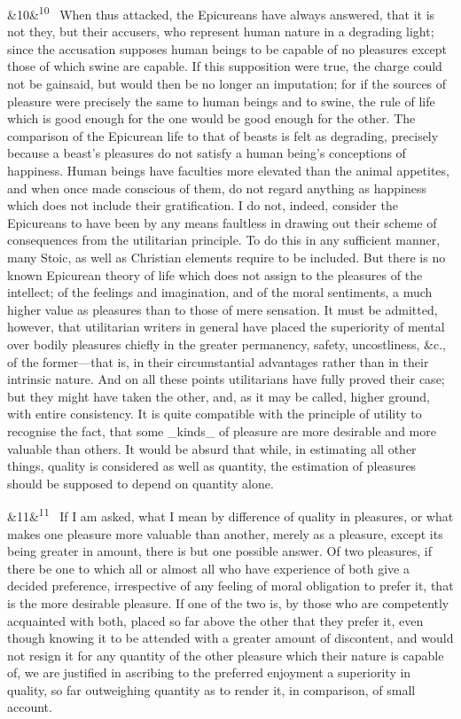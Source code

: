 \documentclass[12pt]{article}
\newcommand{\para}[1][]{\par\noindent\ifx&#1&\else\textsuperscript{\footnotesize #1}~\fi}
\begin{document}
\para[10] When thus attacked, the Epicureans have always answered, that it is not they, but their accusers, who represent human nature in a degrading light; since the accusation supposes human beings to be capable of no pleasures except those of which swine are capable. If this supposition were true, the charge could not be gainsaid, but would then be no longer an imputation; for if the sources of pleasure were precisely the same to human beings and to swine, the rule of life which is good enough for the one would be good enough for the other. The comparison of the Epicurean life to that of beasts is felt as degrading, precisely because a beast's pleasures do not satisfy a human being's conceptions of happiness. Human beings have faculties more elevated than the animal appetites, and when once made conscious of them, do not regard anything as happiness which does not include their gratification. I do not, indeed, consider the Epicureans to have been by any means faultless in drawing out their scheme of consequences from the utilitarian principle. To do this in any sufficient manner, many Stoic, as well as Christian elements require to be included. But there is no known Epicurean theory of life which does not assign to the pleasures of the intellect; of the feelings and imagination, and of the moral sentiments, a much higher value as pleasures than to those of mere sensation. It must be admitted, however, that utilitarian writers in general have placed the superiority of mental over bodily pleasures chiefly in the greater permanency, safety, uncostliness, \&c., of the former---that is, in their circumstantial advantages rather than in their intrinsic nature. And on all these points utilitarians have fully proved their case; but they might have taken the other, and, as it may be called, higher ground, with entire consistency. It is quite compatible with the principle of utility to recognise the fact, that some \_kinds\_ of pleasure are more desirable and more valuable than others. It would be absurd that while, in estimating all other things, quality is considered as well as quantity, the estimation of pleasures should be supposed to depend on quantity alone.

\para[11] If I am asked, what I mean by difference of quality in pleasures, or what makes one pleasure more valuable than another, merely as a pleasure, except its being greater in amount, there is but one possible answer. Of two pleasures, if there be one to which all or almost all who have experience of both give a decided preference, irrespective of any feeling of moral obligation to prefer it, that is the more desirable pleasure. If one of the two is, by those who are competently acquainted with both, placed so far above the other that they prefer it, even though knowing it to be attended with a greater amount of discontent, and would not resign it for any quantity of the other pleasure which their nature is capable of, we are justified in ascribing to the preferred enjoyment a superiority in quality, so far outweighing quantity as to render it, in comparison, of small account.
\end{document}
